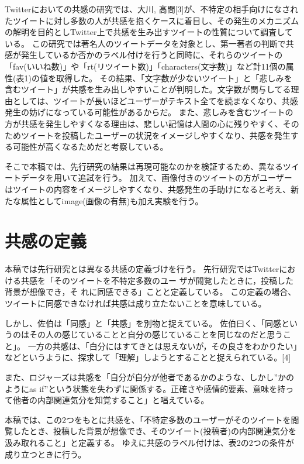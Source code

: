 \documentclass[dvipdfmx]{issj}
\begin{document}
Twitterにおいての共感の研究では、大川, 高間[3]が、不特定の相手向けになされたツイートに対し多数の人が共感を抱くケースに着目し、その発生のメカニズムの解明を目的としTwitter上で共感を生み出すツイートの性質について調査している。
この研究では著名人のツイートデータを対象とし、第一著者の判断で共感が発生しているか否かのラベル付けを行うと同時に、それらのツイートの「fav(いいね数)」や「rt(リツイート数)」「characters(文字数)」など計11個の属性(表1)の値を取得した。
その結果、「文字数が少ないツイート」と「悲しみを含むツイート」が共感を生み出しやすいことが判明した。文字数が関与してる理由としては、ツイートが長いほどユーザーがテキスト全てを読まなくなり、共感発生の妨げになっている可能性があるからだ。
また、悲しみを含むツイートの方が共感を発生しやすくなる理由は、悲しい記憶は人間の心に残りやすく、そのためツイートを投稿したユーザーの状況をイメージしやすくなり、共感を発生する可能性が高くなるためだと考察している。

そこで本稿では、先行研究の結果は再現可能なのかを検証するため、異なるツイートデータを用いて追試を行う。
加えて、画像付きのツイートの方がユーザーはツイートの内容をイメージしやすくなり、共感発生の手助けになると考え、新たな属性としてimage(画像の有無)も加え実験を行う。



\section{共感の定義}  %
本稿では先行研究とは異なる共感の定義づけを行う。
先行研究ではTwitterにおける共感を「そのツイートを不特定多数のユー ザが閲覧したときに，投稿した背景が想像でき，そ れに同感できる」ことと定義している。
この定義の場合、ツイートに同感できなければ共感は成り立たないことを意味している。


しかし、佐伯は「同感」と「共感」を別物と捉えている。
佐伯曰く、「同感というのはその人の感じていることと自分の感じていることを同じなのだと思うこと」。
一方の共感は、「白分にはすてきとは思えないが，その良さをわかりたい」などというように、探求して「理解」しようとすることと捉えられている。[4]


また、ロジャーズは共感を「自分が自分が他者であるかのような、しかし”かのようにas if”という状態を失わずに関係する。正確さや感情的要素、意味を持って他者の内部関連気分を知覚すること」と唱えている。


本稿では、この2つをもとに共感を、「不特定多数のユーザーがそのツイートを閲覧したとき、投稿した背景が想像でき、そのツイート(投稿者)の内部関連気分を汲み取れること」と定義する。
ゆえに共感のラベル付けは、表2の2つの条件が成り立つときに行う。
\end{document}
